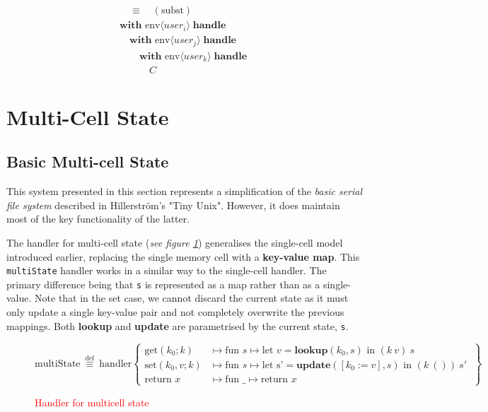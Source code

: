\documentclass[logo,bsc,singlespacing,parskip]{infthesis}
\begin{document}
\[\begin{array}{l}
\quad\equiv\quad (\text{subst}) \\[5pt]
\textbf{with }\text{env} \langle \mathit{user}_i \rangle\; \textbf{handle} \\
\quad\textbf{with }\text{env} \langle \mathit{user}_j \rangle\; \textbf{handle} \\
\qquad\textbf{with }\text{env} \langle \mathit{user}_k \rangle\; \textbf{handle}\; \\
\quad\quad\quad C
\end{array}
\]



\section{Multi-Cell State}


\subsection{Basic Multi-cell State}

This system presented in this section represents a  simplification of the \textit{basic serial file system} described in Hillerström's "Tiny Unix". However, it does maintain most of the key functionality of the latter. 

The handler for multi-cell state (\textit{see figure \ref{fig:multicell-handler}}) generalises the single-cell model introduced earlier, replacing the single memory cell with a \textbf{key-value map}. This \lstinline{multiState} handler works in a similar way to the single-cell handler. The primary difference being that \lstinline{s} is represented as a map rather than as a single-value. Note that in the set case, we cannot discard the current state as it must only update a single key-value pair and not completely overwrite the previous mappings. Both \textbf{lookup} and \textbf{update} are parametrised by the current state, \lstinline{s}.

\begin{figure}[H]
\centering
\[
\text{multiState}\ \overset{\text{def}}{\equiv} \ \text{handler} \left\{
\begin{array}{ll}
\text{get}(k_0; k) &\mapsto \text{fun } s \mapsto \text{let } v = \textbf{lookup}(k_0, s) \text{ in } (k\ v)\ s \\
\text{set}(k_0, v; k) &\mapsto \text{fun } s \mapsto \text{let s'} = \textbf{update}([k_0:=v],s) \text{ in } (k\ ())\ s'\ \\
\text{return } x &\mapsto \text{fun } \_ \mapsto \text{return } x
\end{array}
\right\}
\]
\caption{\textcolor{red}{Handler for multicell state}}
\label{fig:multicell-handler}
\end{figure}
\end{document}
